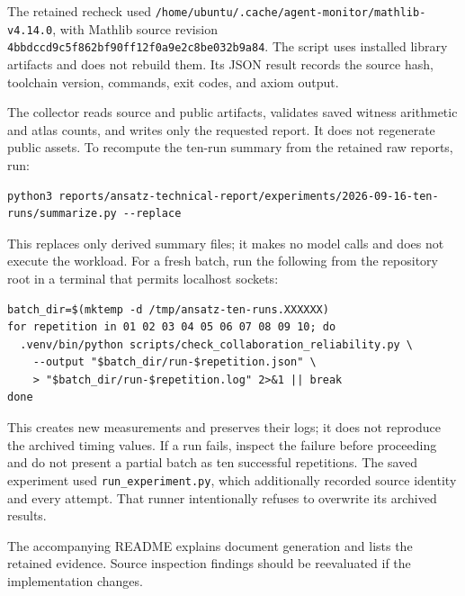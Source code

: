\documentclass[10pt,letterpaper]{article}
\begin{document}
The retained recheck used \nolinkurl{/home/ubuntu/.cache/agent-monitor/mathlib-v4.14.0}, with Mathlib source revision \nolinkurl{4bbdccd9c5f862bf90ff12f0a9e2c8be032b9a84}. The script uses installed library artifacts and does not rebuild them. Its JSON result records the source hash, toolchain version, commands, exit codes, and axiom output.


The collector reads source and public artifacts, validates saved witness arithmetic and atlas counts, and writes only the requested report. It does not regenerate public assets. To recompute the ten-run summary from the retained raw reports, run:

\begin{lstlisting}
python3 reports/ansatz-technical-report/experiments/2026-09-16-ten-runs/summarize.py --replace
\end{lstlisting}


This replaces only derived summary files; it makes no model calls and does not execute the workload. For a fresh batch, run the following from the repository root in a terminal that permits localhost sockets:

\begin{lstlisting}
batch_dir=$(mktemp -d /tmp/ansatz-ten-runs.XXXXXX)
for repetition in 01 02 03 04 05 06 07 08 09 10; do
  .venv/bin/python scripts/check_collaboration_reliability.py \
    --output "$batch_dir/run-$repetition.json" \
    > "$batch_dir/run-$repetition.log" 2>&1 || break
done
\end{lstlisting}

This creates new measurements and preserves their logs; it does not reproduce the archived timing values. If a run fails, inspect the failure before proceeding and do not present a partial batch as ten successful repetitions. The saved experiment used \nolinkurl{run_experiment.py}, which additionally recorded source identity and every attempt. That runner intentionally refuses to overwrite its archived results.

The accompanying README explains document generation and lists the retained evidence. Source inspection findings should be reevaluated if the implementation changes.
\end{document}
